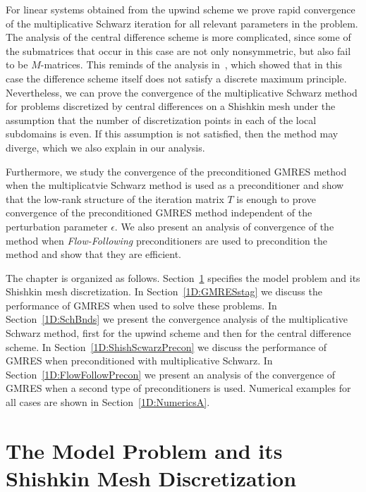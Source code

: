 For linear systems obtained from the upwind scheme we prove rapid convergence
of the  multiplicative Schwarz iteration for all relevant parameters in the
problem. The analysis of the central difference scheme is more complicated,
since some of the submatrices that occur in this case are not only
nonsymmetric, but also fail to be $M$-matrices. This reminds of the analysis
in~\cite{AndKop96}, which showed that in this case the difference scheme
itself does not satisfy a discrete maximum principle. Nevertheless, we can
prove the convergence of the multiplicative Schwarz method for problems
discretized by central differences on a Shishkin mesh under the assumption
that the number of discretization points in each of the local subdomains is
even. If this assumption is not satisfied, then the method may diverge, which
we also explain in our analysis.

Furthermore, we study the convergence of the preconditioned GMRES method when the multiplicatvie Schwarz method is used as a preconditioner and show that the low-rank structure of the iteration matrix $T$ is enough to prove convergence of the preconditioned GMRES method independent of the perturbation parameter $\epsilon$. We also present an analysis of convergence of the method when \emph{Flow-Following} preconditioners are used to precondition the method and show that they are efficient.

The chapter is organized as follows. Section~\ref{1D:Problem} specifies the
model problem and its Shishkin mesh discretization.
In Section~\ref{1D:GMRESstag} we discuss the performance of GMRES when used to
solve these problems.
In Section~\ref{1D:SchBnds} we present the convergence
analysis of the multiplicative Schwarz method, first for the upwind scheme and
then for the central difference scheme.
In Section~\ref{1D:ShishScwarzPrecon} we discuss the performance of GMRES when preconditioned with multiplicative Schwarz.
In Section~\ref{1D:FlowFollowPrecon} we present an analysis of the convergence of GMRES when a second type of preconditioners is used.
Numerical examples for all cases are shown in Section~\ref{1D:NumericsA}.

\section{The Model Problem and its Shishkin Mesh Discretization}
\label{1D:Problem}

